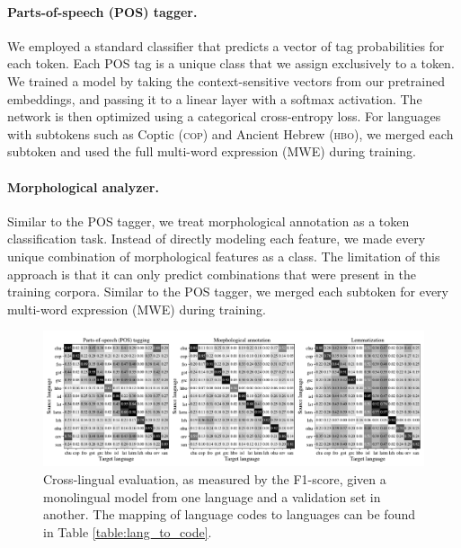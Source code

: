 \documentclass[11pt]{article}
\begin{document}
\paragraph{Parts-of-speech (POS) tagger.}
We employed a standard classifier that predicts a vector of tag probabilities for each token.
Each POS tag is a unique class that we assign exclusively to a token.
We trained a model by taking the context-sensitive vectors from our pretrained embeddings, and passing it to a linear layer with a softmax activation.
The network is then optimized using a categorical cross-entropy loss.
For languages with subtokens such as Coptic (\textsc{cop}) and Ancient Hebrew (\textsc{hbo}), we merged each subtoken and used the full multi-word expression (MWE) during training.

\paragraph{Morphological analyzer.}
Similar to the POS tagger, we treat morphological annotation as a token classification task.
Instead of directly modeling each feature, we made every unique combination of morphological features as a class.
The limitation of this approach is that it can only predict combinations that were present in the training corpora.
Similar to the POS tagger, we merged each subtoken for every multi-word expression (MWE) during training.

\begin{figure}[t]
  \centering
  \includegraphics[width=\textwidth]{figures/cross_lingual.pdf}
  \caption{
    Cross-lingual evaluation, as measured by the F1-score, given a monolingual model from one language and a validation set in another.
    The mapping of language codes to languages can be found in Table \ref{table:lang_to_code}.
  }
  \label{fig:cross_lingual}
\end{figure}
\end{document}
